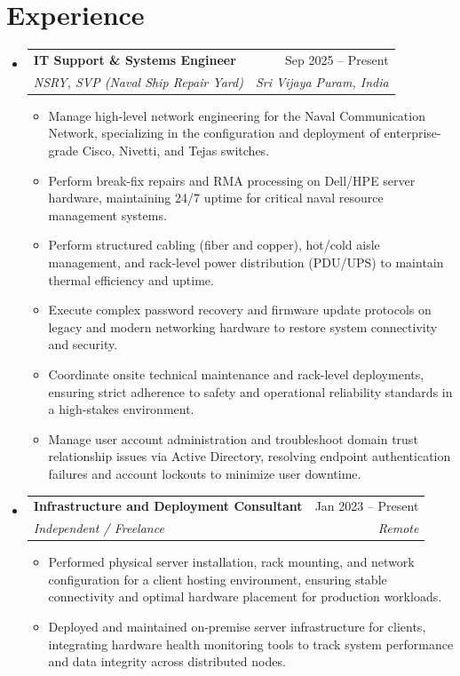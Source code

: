 \documentclass[letterpaper,11pt]{article}
\makeatletter
\newcommand{\resumeItem}[1]{
  \item\small{
    {#1 \vspace{-2pt}}
  }
}
\newcommand{\resumeSubheading}[4]{
  \vspace{-2pt}\item
    \begin{tabular*}{0.97\textwidth}[t]{l@{\extracolsep{\fill}}r}
      \textbf{#1} & #2 \\
      \textit{\small#3} & \textit{\small #4} \\
    \end{tabular*}\vspace{-7pt}
}
\newcommand{\resumeSubHeadingListStart}{\begin{itemize}[leftmargin=0.15in, label={}]}
\newcommand{\resumeSubHeadingListEnd}{\end{itemize}}
\newcommand{\resumeItemListStart}{\begin{itemize}}
\newcommand{\resumeItemListEnd}{\end{itemize}\vspace{-5pt}}
\makeatother
\begin{document}
\section{Experience}
  \resumeSubHeadingListStart

    \resumeSubheading
      {IT Support \& Systems Engineer}{Sep 2025 -- Present}
      {NSRY, SVP (Naval Ship Repair Yard)}{Sri Vijaya Puram, India}
\resumeItemListStart
        \resumeItem{Manage high-level network engineering for the Naval Communication Network, specializing in the configuration and deployment of enterprise-grade Cisco, Nivetti, and Tejas switches.}
        \resumeItem{Perform break-fix repairs and RMA processing on Dell/HPE server hardware, maintaining 24/7 uptime for critical naval resource management systems.}
        \resumeItem{Perform structured cabling (fiber and copper), hot/cold aisle management, and rack-level power distribution (PDU/UPS) to maintain thermal efficiency and uptime.}
        \resumeItem{ Execute complex password recovery and firmware update protocols on legacy and modern networking hardware to restore system connectivity and security.}
        \resumeItem{Coordinate onsite technical maintenance and rack-level deployments, ensuring strict adherence to safety and operational reliability standards in a high-stakes environment.}
        \resumeItem{Manage user account administration and troubleshoot domain trust relationship issues via Active Directory, resolving endpoint authentication failures and account lockouts to minimize user downtime.}
      \resumeItemListEnd
      
\resumeSubheading
      {Infrastructure and Deployment Consultant}{Jan 2023 -- Present}
      {Independent / Freelance}{Remote}
      \resumeItemListStart
        \resumeItem{Performed physical server installation, rack mounting, and network configuration for a client hosting environment, ensuring stable connectivity and optimal hardware placement for production workloads.}
        \resumeItem{Deployed and maintained on-premise server infrastructure for clients, integrating hardware health monitoring tools to track system performance and data integrity across distributed nodes.}
      \resumeItemListEnd

  \resumeSubHeadingListEnd


\end{document}
